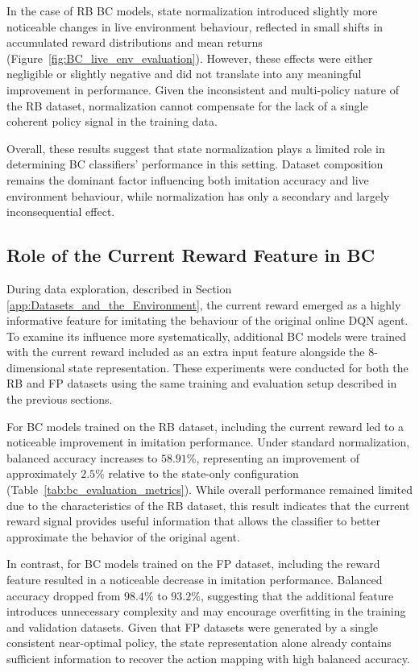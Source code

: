 In the case of RB BC models, state normalization introduced slightly more noticeable changes in live environment behaviour, reflected in small shifts in accumulated reward distributions and mean returns (Figure~\ref{fig:BC_live_env_evaluation}). However, these effects were either negligible or slightly negative and did not translate into any meaningful improvement in performance. Given the inconsistent and multi-policy nature of the RB dataset, normalization cannot compensate for the lack of a single coherent policy signal in the training data.

Overall, these results suggest that state normalization plays a limited role in determining BC classifiers’ performance in this setting. Dataset composition remains the dominant factor influencing both imitation accuracy and live environment behaviour, while normalization has only a secondary and largely inconsequential effect.





\subsection{Role of the Current Reward Feature in BC}
During data exploration, described in Section \ref{app:Datasets_and_the_Environment}, the current reward emerged as a highly informative feature for imitating the behaviour of the original online DQN agent. To examine its influence more systematically, additional BC models were trained with the current reward included as an extra input feature alongside the 8-dimensional state representation. These experiments were conducted for both the RB and FP datasets using the same training and evaluation setup described in the previous sections.

For BC models trained on the RB dataset, including the current reward led to a noticeable improvement in imitation performance. Under standard normalization, balanced accuracy increases to $58.91\%$, representing an improvement of approximately $2.5\%$ relative to the state-only configuration (Table~\ref{tab:bc_evaluation_metrics}). While overall performance remained limited due to the characteristics of the RB dataset, this result indicates that the current reward signal provides useful information that allows the classifier to better approximate the behavior of the original agent.

In contrast, for BC models trained on the FP dataset, including the reward feature resulted in a noticeable decrease in imitation performance. Balanced accuracy dropped from $98.4\%$ to $93.2\%$, suggesting that the additional feature introduces unnecessary complexity and may encourage overfitting in the training and validation datasets. Given that FP datasets were generated by a single consistent near-optimal policy, the state representation alone already contains sufficient information to recover the action mapping with high balanced accuracy.


